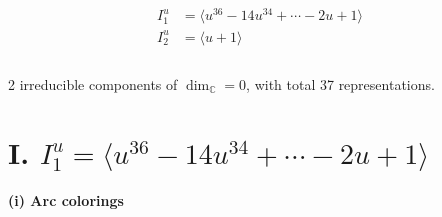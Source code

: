 \documentclass[1p]{elsarticle_modified}
\theoremstyle{definition}
\begin{document}
\begin{align*}
I^u_{1}&=\langle 
u^{36}-14 u^{34}+\cdots-2 u+1\rangle \\
I^u_{2}&=\langle 
u+1\rangle \\
\\
\end{align*}
\raggedright * 2 irreducible components of $\dim_{\mathbb{C}}=0$, with total 37 representations.\\
\newpage
\renewcommand{\arraystretch}{1}
\centering \section*{I. $I^u_{1}= \langle u^{36}-14 u^{34}+\cdots-2 u+1 \rangle$}
\flushleft \textbf{(i) Arc colorings}\\
\end{document}
